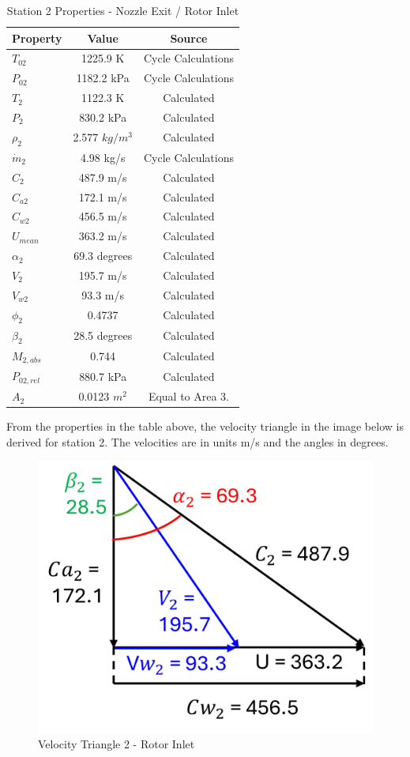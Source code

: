 \documentclass[12pt, letter]{report}
\begin{document}
\begin{table}[H]
\caption{Station 2 Properties - Nozzle Exit / Rotor Inlet}
\centering
\begin{tabular}{|l|c|c|}
\hline
\textbf{Property} & \textbf{Value} & \textbf{Source} \\ \hline
$T_{02}$ & 1225.9 K & Cycle Calculations\\ \hline
$P_{02}$ & 1182.2 kPa & Cycle Calculations\\ \hline
$T_{2}$ & 1122.3 K& Calculated\\ \hline
$P_{2}$ & 830.2 kPa & Calculated\\ \hline
$\rho_{2}$ & 2.577 $kg/m^3$ & Calculated\\ \hline
$\dot{m}_2$ & 4.98 kg/s & Cycle Calculations\\ \hline
$C_2$ & 487.9 m/s & Calculated\\ \hline
$C_{a2}$ & 172.1 m/s& Calculated\\ \hline
$C_{w2}$ & 456.5 m/s & Calculated\\ \hline
$U_{mean}$ & 363.2 m/s & Calculated \\ \hline
$\alpha_2$ & 69.3 degrees & Calculated\\ \hline
$V_2$ & 195.7 m/s & Calculated\\ \hline
$V_{w2}$ & 93.3 m/s & Calculated\\ \hline
$\phi_2$ & 0.4737 & Calculated\\ \hline
$\beta_2$ & 28.5 degrees & Calculated\\ \hline
$M_{2,abs}$ & 0.744 & Calculated \\ \hline
$P_{02,rel}$ & 880.7 kPa & Calculated\\ \hline
$A_2$ & 0.0123 $m^2$ & Equal to Area 3.\\ \hline
\end{tabular}
\label{tab:my_label}
\end{table}



From the properties in the table above, the velocity triangle in the image below is derived for station 2. The velocities are in units m/s and the angles in degrees. 

\begin{figure}[H]
    \centering
    \includegraphics[width=0.4\linewidth]{figures/velocity_triangle_2.png}
    \caption{Velocity Triangle 2 - Rotor Inlet}
    \label{fig:enter-label}
\end{figure}
\end{document}
